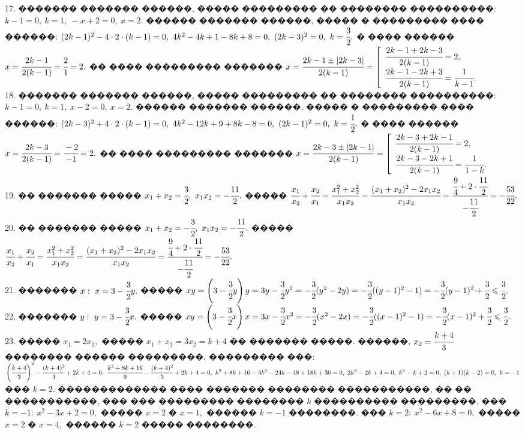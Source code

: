 \documentclass[12pt]{article}
\begin{document}
17. ������� ������� ������, ����� ��������� �� �������� ����������: $k-1=0,\ k=1,\ -x+2=0,\ x=2.$ ������ ������� ������, ����� � ��������� ���� ������:
$(2k-1)^2-4\cdot2\cdot(k-1)=0,\ 4k^2-4k+1-8k+8=0,\ (2k-3)^2=0,\ k=\cfrac{3}{2}.$ � ���� ������ $x=\cfrac{2k-1}{2(k-1)}=\cfrac{2}{1}=2.$ �� ���� ��������� ������� $x=\cfrac{2k-1\pm|2k-3|}{2(k-1)}=\left[\begin{array}{l}\cfrac{2k-1+2k-3}{2(k-1)}=2,\\ \cfrac{2k-1-2k+3}{2(k-1)}=\cfrac{1}{k-1}.\end{array}\right.$\\
18. ������� ������� ������, ����� ��������� �� �������� ����������: $k-1=0,\ k=1,\ x-2=0,\ x=2.$ ������ ������� ������, ����� � ��������� ���� ������:
$(2k-3)^2+4\cdot2\cdot(k-1)=0,\ 4k^2-12k+9+8k-8=0,\ (2k-1)^2=0,\ k=\cfrac{1}{2}.$ � ���� ������ $x=\cfrac{2k-3}{2(k-1)}=\cfrac{-2}{-1}=2.$ �� ���� ��������� ������� $x=\cfrac{2k-3\pm|2k-1|}{2(k-1)}=\left[\begin{array}{l}\cfrac{2k-3+2k-1}{2(k-1)}=2,\\ \cfrac{2k-3-2k+1}{2(k-1)}=\cfrac{1}{1-k}.\end{array}\right.$\\
19. �� ������� ����� $x_1+x_2=\cfrac{3}{2},\ x_1x_2=-\cfrac{11}{2}.$ ����� $\cfrac{x_1}{x_2}+\cfrac{x_2}{x_1}=\cfrac{x_1^2+x_2^2}{x_1x_2}=
\cfrac{(x_1+x_2)^2-2x_1x_2}{x_1x_2}=\cfrac{\cfrac{9}{4}+2\cdot\cfrac{11}{2}}{-\cfrac{11}{2}}=-\cfrac{53}{22}.$\\
20. �� ������� ����� $x_1+x_2=-\cfrac{3}{2},\ x_1x_2=-\cfrac{11}{2}.$ ����� $\cfrac{x_1}{x_2}+\cfrac{x_2}{x_1}=\cfrac{x_1^2+x_2^2}{x_1x_2}=
\cfrac{(x_1+x_2)^2-2x_1x_2}{x_1x_2}=\cfrac{\cfrac{9}{4}+2\cdot\cfrac{11}{2}}{-\cfrac{11}{2}}=-\cfrac{53}{22}.$\\
21. ������� $x:\ x=3-\cfrac{3}{2}y.$ ����� $xy=\left(3-\cfrac{3}{2}y\right)y=3y-\cfrac{3}{2}y^2=-\cfrac{3}{2}(y^2-2y)=
-\cfrac{3}{2}((y-1)^2-1)=-\cfrac{3}{2}(y-1)^2+\cfrac{3}{2}\leqslant\cfrac{3}{2}.$\\
22. ������� $y:\ y=3-\cfrac{3}{2}x.$ ����� $xy=\left(3-\cfrac{3}{2}x\right)x=3x-\cfrac{3}{2}x^2=-\cfrac{3}{2}(x^2-2x)=
-\cfrac{3}{2}((x-1)^2-1)=-\cfrac{3}{2}(x-1)^2+\cfrac{3}{2}\leqslant\cfrac{3}{2}.$\\
23. ����� $x_1=2x_2,$ ����� $x_1+x_2=3x_2=k+4$ �� ������� �����. ������, $x_2=\cfrac{k+4}{3}$ �������� ������ ���������, ��������� ���:
$\left(\cfrac{k+4}{3}\right)^2-\cfrac{(k+4)^2}{3}+2k+4=0,\ \cfrac{k^2+8k+16}{9}-\cfrac{(k+4)^2}{3}+2k+4=0,\ k^2+8k+16-3k^2-24k-48+18k+36=0,\
2k^2-2k+4=0,\ k^2-k+2=0,\ (k+1)(k-2)=0,\ k=-1$ ��� $k=2.$ ������������� ���� ������� �������� �����������, �� �� �����������, ��� ��� ��������� �������� $k$ ���������� ���������. ��� $k=-1:\ x^2-3x+2=0,$ ����� $x=2$ � $x=1,$ ������ $k=-1$ ��������. ��� $k=2:\ x^2-6x+8=0,$ ����� $x=2$ � $x=4,$ ������ $k=2$ ����� ��������.\\
\end{document}
